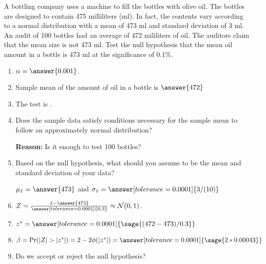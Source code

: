 \documentclass{ximera}
\begin{document}
\begin{problem}
A bottling company uses a machine to fill the bottles with olive oil. The bottles are designed
to contain 475 milliliters (ml). In fact, the contents vary according to a normal distribution with
a mean of 473 ml and standard deviation of 3 ml. An audit of 100 bottles had an average of 472 mililiters of oil. The auditors claim that the mean size is not 473 ml. Test the null hypothesis that the mean oil amount in a bottle is 473 ml at the significance of 0.1\%.

\begin{explanation}
\begin{enumerate}
    \item $\alpha=\answer{0.001}$.
    \item Sample mean of the amount of oil in a bottle is $\answer{472}$
     \item The test is .
    \item Does the sample data satisfy conditions necessary for the sample mean to follow an
approximately normal distribution?
\begin{multipleChoice}
\end{multipleChoice}
{\bf Reason:} Is it enough to test 100 bottles? 
    
    \item Based on the null hypothesis, what should you assume to be the mean and standard deviation of your data? 

$\mu_{\bar x}=\answer{473}$ and $\sigma_{\bar x}=\answer[tolerance=0.0001]{{3/(10)}}$
    \item $Z=\frac{\bar x -\answer{473}}{\answer[tolerance=0.0001]{0.3}}\approx \mathcal N(0,1)$.
    \item $z^*=\answer[tolerance=0.0001]{\sage{(472-473)/0.3}}$
    \item $\beta=\Pr(|Z|>|z^*|)=2-2\phi(|z^*|)=\answer[tolerance=0.0001]{\sage{2*0.00043}}$
    \item Do we accept or reject the null hypothesis?
    \begin{multipleChoice}
    \end{multipleChoice}
\end{enumerate}
\end{explanation}
\end{problem}
\end{document}
